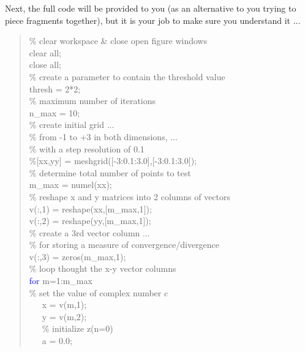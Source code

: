 \documentclass{tufte-book} %
\newenvironment{docspec}{\begin{quotation}\ttfamily\parskip0pt\parindent0pt\ignorespaces}{\end{quotation}}
\begin{document}
\noindent Next, the full code will be provided to you (as an alternative to you trying to piece fragments together), but it is your job to make sure you understand it ...

\newpage

\begin{docspec}
\textcolor[rgb]{0,0.501961,0}{\% clear workspace \& close open figure windows\\}
clear \textcolor[rgb]{1,0,1}{all};\\
close \textcolor[rgb]{1,0,1}{all};\\
\textcolor[rgb]{0,0.501961,0}{\% create a parameter to contain the threshold value\\}
thresh = 2*2;\\
\textcolor[rgb]{0,0.501961,0}{\% maximum number of iterations\\}
n\_max = 10;\\
\textcolor[rgb]{0,0.501961,0}{\% create initial grid ...\\
\% from -1 to +3 in both dimensions, ...\\
\% with a step resolution of 0.1\\}
\textcolor[rgb]{1,1,1}{\%}[xx,yy] = meshgrid([-3:0.1:3.0],[-3:0.1:3.0]);\\
\textcolor[rgb]{0,0.501961,0}{\% determine total number of points to test\\}
m\_max = numel(xx);\\
\textcolor[rgb]{0,0.501961,0}{\% reshape x and y matrices into 2 columns of vectors\\}
v(:,1) = reshape(xx,[m\_max,1]);\\
v(:,2) = reshape(yy,[m\_max,1]);\\
\textcolor[rgb]{0,0.501961,0}{\% create a 3rd vector column ...\\
\% for storing a measure of convergence/divergence\\}
v(:,3) = zeros(m\_max,1);\\
\textcolor[rgb]{0,0.501961,0}{\% loop thought the x-y vector columns\\}
\textcolor{blue}{for} m=1:m\_max\\
\textcolor[rgb]{0,0.501961,0}{\% set the value of complex number c\\}
\ \ \     x = v(m,1);\\
\ \ \     y = v(m,2);\\
\ \ \     \textcolor[rgb]{0,0.501961,0}{\% initialize z(n=0)\\}
\ \ \     a = 0.0;\\

\end{docspec}
\end{document}
